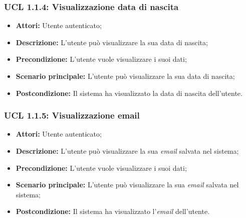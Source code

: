 \hypertarget{L1.1.4}{}
\subsubsection{UCL 1.1.4: Visualizzazione data di nascita}
\begin{itemize}
	\item \textbf{Attori:} Utente autenticato;
	\item \textbf{Descrizione:} L'utente può visualizzare la sua data di nascita;
	\item \textbf{Precondizione:} L'utente vuole visualizzare i suoi dati;
	\item \textbf{Scenario principale:} L'utente può visualizzare la sua data di nascita;
	\item \textbf{Postcondizione:} Il sistema ha visualizzato la data di nascita dell'utente.
\end{itemize}

\hypertarget{L1.1.5}{}
\subsubsection{UCL 1.1.5: Visualizzazione email}
\begin{itemize}
	\item \textbf{Attori:} Utente autenticato;
	\item \textbf{Descrizione:} L'utente può visualizzare la sua \textit{email} salvata nel sistema;
	\item \textbf{Precondizione:} L'utente vuole visualizzare i suoi dati;
	\item \textbf{Scenario principale:} L'utente può visualizzare la sua \textit{email} salvata nel sistema;
	\item \textbf{Postcondizione:} Il sistema ha visualizzato l'\textit{email} dell'utente.
\end{itemize}

 
\hypertarget{L1.2}{}
